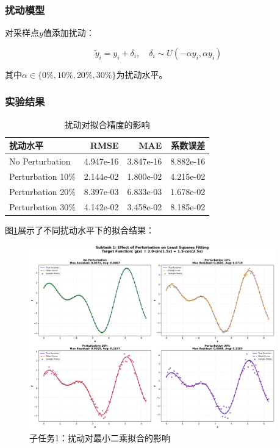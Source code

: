 \documentclass[a4paper,12pt]{article}
\theoremstyle{definition}
\begin{document}
\subsubsection{扰动模型}

对采样点$y$值添加扰动：

\begin{equation}
\tilde{y}_i = y_i + \delta_i, \quad \delta_i \sim U(-\alpha y_i, \alpha y_i)
\end{equation}

其中$\alpha \in \{0\%, 10\%, 20\%, 30\%\}$为扰动水平。

\subsubsection{实验结果}

\begin{table}[H]
\centering
\caption{扰动对拟合精度的影响}
\begin{tabular}{lrrr}
\toprule
\textbf{扰动水平} & \textbf{RMSE} & \textbf{MAE} & \textbf{系数误差} \\
\midrule
No Perturbation & 4.947e-16 & 3.847e-16 & 8.882e-16 \\
Perturbation 10\% & 2.144e-02 & 1.800e-02 & 4.215e-02 \\
Perturbation 20\% & 8.397e-03 & 6.833e-03 & 1.678e-02 \\
Perturbation 30\% & 4.142e-02 & 3.458e-02 & 8.185e-02 \\
\bottomrule
\end{tabular}
\end{table}

图\ref{fig:task2_subtask1}展示了不同扰动水平下的拟合结果：

\begin{figure}[H]
\centering
\includegraphics[width=0.95\textwidth]{results/task2/subtask1/comprehensive_comparison.png}
\caption{子任务1：扰动对最小二乘拟合的影响}
\label{fig:task2_subtask1}
\end{figure}
\end{document}
